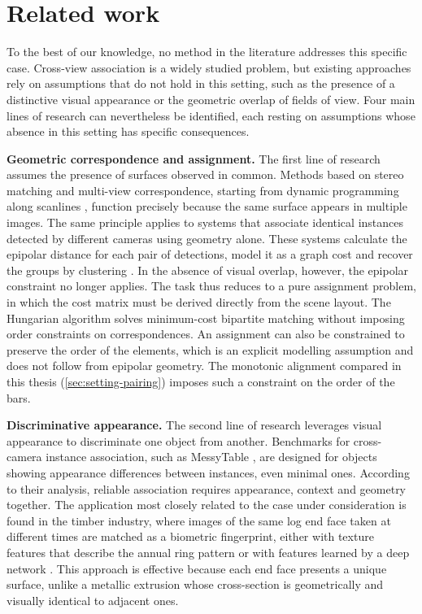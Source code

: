 \documentclass[a4paper, 12pt, twoside]{book}
\newcommand{\citev}[1]{\citeauthor{#1} \citeyear{#1} \cite{#1}}
\begin{document}
\section{Related work}
\label{sec:intro-related}

To the best of our knowledge, no method in the literature addresses this specific case. Cross-view association is a widely studied problem, but existing approaches rely on assumptions that do not hold in this setting, such as the presence of a distinctive visual appearance or the geometric overlap of fields of view.
Four main lines of research can nevertheless be identified, each resting on assumptions whose absence in this setting has specific consequences.

\textbf{Geometric correspondence and assignment.} The first line of research assumes the presence of surfaces observed in common. Methods based on stereo matching and multi-view correspondence, starting from dynamic programming along scanlines \citev{ohta1985}, function precisely because the same surface appears in multiple images. The same principle applies to systems that associate identical instances detected by different cameras using geometry alone. These systems calculate the epipolar distance for each pair of detections, model it as a graph cost and recover the groups by clustering \citev{sun2025}. In the absence of visual overlap, however, the epipolar constraint no longer applies. The task thus reduces to a pure assignment problem, in which the cost matrix must be derived directly from the scene layout. The Hungarian algorithm solves minimum-cost bipartite matching \citev{kuhn1955} without imposing order constraints on correspondences. An assignment can also be constrained to preserve the order of the elements, which is an explicit modelling assumption and does not follow from epipolar geometry. The monotonic alignment compared in this thesis (\cref{sec:setting-pairing}) imposes such a constraint on the order of the bars.

\textbf{Discriminative appearance.} The second line of research leverages visual appearance to discriminate one object from another. Benchmarks for cross-camera instance association, such as MessyTable \citev{cai2020}, are designed for objects showing appearance differences between instances, even minimal ones. According to their analysis, reliable association requires appearance, context and geometry together. The application most closely related to the case under consideration is found in the timber industry, where images of the same log end face taken at different times are matched as a biometric fingerprint, either with texture features that describe the annual ring pattern \citev{schraml2015} or with features learned by a deep network \citev{xie2025}. This approach is effective because each end face presents a unique surface, unlike a metallic extrusion whose cross-section is geometrically and visually identical to adjacent ones.
\end{document}
